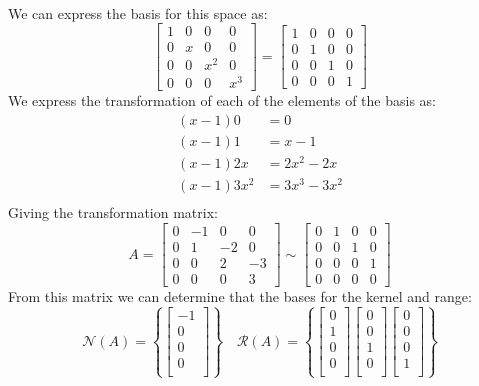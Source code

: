 \documentclass[letterpaper,12pt]{article}
\theoremstyle{definition}
\begin{document}
\\
We can express the basis for this space as:
\[
\begin{bmatrix}
    1 & 0 & 0 & 0 \\
    0 & x & 0 & 0 \\
    0 & 0 & x^2 & 0 \\
    0 & 0 & 0 & x^3 
\end{bmatrix}
=
\begin{bmatrix}
    1 & 0 & 0 & 0 \\
    0 & 1 & 0 & 0 \\
    0 & 0 & 1 & 0 \\
    0 & 0 & 0 & 1 
\end{bmatrix}
\]
We express the transformation of each of the elements of the basis as:
\begin{align*}
(x-1)0 &= 0 \\
(x-1)1 &= x-1 \\
(x-1)2x &= 2x^2-2x \\
(x-1)3x^2 &= 3x^3-3x^2 \\
\end{align*}
Giving the transformation matrix:
\[
A = 
\begin{bmatrix}
    0 & -1 & 0 & 0 \\
    0 & 1 & -2 & 0 \\
    0 & 0 & 2 & -3 \\
    0 & 0 & 0 & 3 
\end{bmatrix}
\sim
\begin{bmatrix}
    0 & 1 & 0 & 0 \\
    0 & 0 & 1 & 0 \\
    0 & 0 & 0 & 1 \\
    0 & 0 & 0 & 0 
\end{bmatrix}
\]
From this matrix we can determine that the bases for the kernel and range:
\[
\mathscr{N}(A) = 
\left\{ \begin{bmatrix} -1 \\ 0 \\ 0 \\ 0 \\ \end{bmatrix} \right\}
\quad
\mathscr{R}(A) = 
\left\{ 
\begin{bmatrix} 0 \\ 1 \\ 0 \\ 0 \\ \end{bmatrix}
\begin{bmatrix} 0 \\ 0 \\ 1 \\ 0 \\ \end{bmatrix}
\begin{bmatrix} 0 \\ 0 \\ 0 \\ 1 \\ \end{bmatrix}
\right\}
\]
\end{document}
